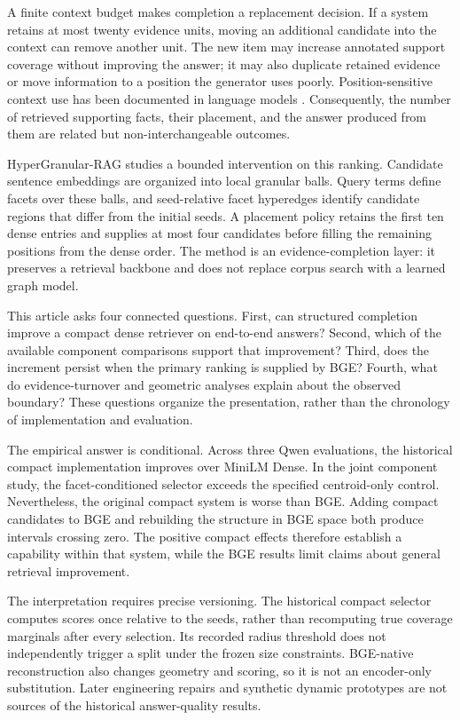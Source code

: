 \documentclass[11pt,a4paper]{article}
\newcommand{\hgrag}{HyperGranular-RAG\xspace}
\begin{document}
A finite context budget makes completion a replacement decision. If a system
retains at most twenty evidence units, moving an additional candidate into the
context can remove another unit. The new item may increase annotated support
coverage without improving the answer; it may also duplicate retained
evidence or move information to a position the generator uses poorly.
Position-sensitive context use has been documented in language models
\citep{liu2024lostmiddle}. Consequently, the number of retrieved supporting
facts, their placement, and the answer produced from them are related but
non-interchangeable outcomes.

\hgrag studies a bounded intervention on this ranking. Candidate sentence
embeddings are organized into local granular balls. Query terms define facets
over these balls, and seed-relative facet hyperedges identify candidate
regions that differ from the initial seeds. A placement policy retains the
first ten dense entries and supplies at most four candidates before filling
the remaining positions from the dense order. The method is an
evidence-completion layer: it preserves a retrieval backbone and does not
replace corpus search with a learned graph model.

This article asks four connected questions. First, can structured completion
improve a compact dense retriever on end-to-end answers? Second, which of the
available component comparisons support that improvement? Third, does the
increment persist when the primary ranking is supplied by BGE? Fourth, what
do evidence-turnover and geometric analyses explain about the observed
boundary? These questions organize the presentation, rather than the
chronology of implementation and evaluation.

The empirical answer is conditional. Across three Qwen evaluations, the
historical compact implementation improves over MiniLM Dense. In the joint
component study, the facet-conditioned selector exceeds the specified
centroid-only control. Nevertheless, the original compact system is worse
than BGE. Adding compact candidates to BGE and rebuilding the structure in
BGE space both produce intervals crossing zero. The positive compact effects
therefore establish a capability within that system, while the BGE results
limit claims about general retrieval improvement.

The interpretation requires precise versioning. The historical compact
selector computes scores once relative to the seeds, rather than recomputing
true coverage marginals after every selection. Its recorded radius threshold
does not independently trigger a split under the frozen size constraints.
BGE-native reconstruction also changes geometry and scoring, so it is not
an encoder-only substitution. Later engineering repairs and synthetic dynamic
prototypes are not sources of the historical answer-quality results.
\end{document}
